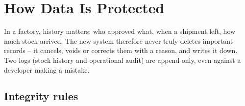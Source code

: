\section{How Data Is Protected}\label{sec:integrity}

\begin{plainwords}
In a factory, history matters: who approved what, when a shipment left, how much stock
arrived. The new system therefore never truly deletes important records -- it cancels,
voids or corrects them with a reason, and writes it down. Two logs (stock history and
operational audit) are append-only, even against a developer making a mistake.
\end{plainwords}

\subsection*{Integrity rules}

